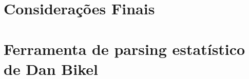 \documentclass[a4paper]{abnt}
\begin{document}
\chapter{Considerações Finais}
\label{cha:consuderacoes_finais}
	

\appendix

\chapter{Ferramenta de parsing estatístico de Dan Bikel}
\label{cha:dan_bikel1}
	


%	

%

\renewcommand{\bibname}{Referência Bibliografia}

\end{document}
